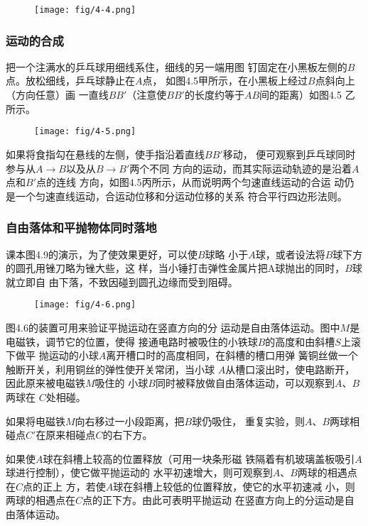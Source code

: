 \begin{figure}[htp]
    \centering
    \texttt{[image: fig/4-4.png]}
    \caption{}
\end{figure}

\subsubsection{运动的合成}
把一个注满水的乒乓球用细线系住，细线的另一端用图
钉固定在小黑板左侧的$B$点。放松细线，乒乓球静止在$A$点，
如图4.5甲所示，在小黑板上经过$B$点斜向上（方向任意）画
一直线$BB'$（注意使$BB'$的长度约等于$AB$间的距离）如图4.5
乙所示。
\begin{figure}[htp]
    \centering
    \texttt{[image: fig/4-5.png]}
    \caption{}
\end{figure}

如果将食指勾在悬线的左侧，使手指沿着直线$BB'$移动，
便可观察到乒乓球同时参与从$A\to B$以及从$B\to B'$两个不同
方向的运动，而其实际运动轨迹的是沿着$A$点和$B'$点的连线
方向，如图4.5丙所示，从而说明两个匀速直线运动的合运
动仍是一个匀速直线运动，合运动位移和分运动位移的关系
符合平行四边形法则。

\subsubsection{自由落体和平抛物体同时落地}
课本图4.9的演示，为了使效果更好，可以使$B$球略
小于$A$球，或者设法将$B$球下方的圆孔用锉刀略为锉大些，这
样，当小锤打击弹性金属片把A球抛出的同时，$B$球就立即自
由下落，不致因碰到圆孔边缘而受到阻碍。
\begin{figure}[htp]
    \centering
    \texttt{[image: fig/4-6.png]}
    \caption{}
\end{figure}

图4.6的装置可用来验证平抛运动在竖直方向的分
运动是自由落体运动。图中$M$是电磁铁，调节它的位置，使得
接通电路时被吸住的小铁球$B$的高度和由斜槽$S$上滚下做平
抛运动的小球$A$离开槽口时的高度相同，在斜槽的槽口用弹
簧铜丝做一个触断开关，利用铜丝的弹性使开关常闭，当小球
$A$从槽口滚出时，使电路断开，因此原来被电磁铁$M$吸住的
小球$B$同时被释放做自由落体运动，可以观察到$A$、$B$两球在
$C$处相碰。

如果将电磁铁$M$向右移过一小段距离，把$B$球仍吸住，
重复实验，则$A$、$B$两球相碰点$C'$在原来相碰点$C$的右下方。

如果使$A$球在斜槽上较高的位置释放（可用一块条形磁
铁隔着有机玻璃盖板吸引$A$球进行控制），使它做平抛运动的
水平初速增大，则可观察到$A$、$B$两球的相遇点在$C$点的正上
方，若使$A$球在斜槽上较低的位置释放，使它的水平初速减
小，则两球的相遇点在$C$点的正下方。由此可表明平抛运动
在竖直方向上的分运动是自由落体运动。


